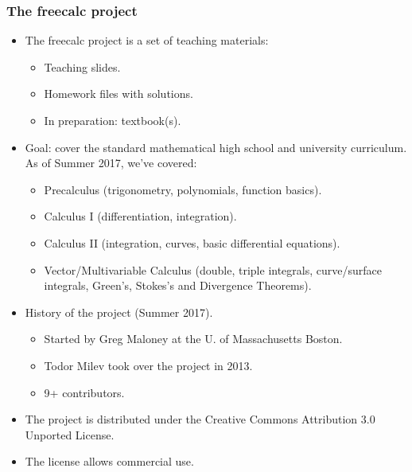 \begin{frame}
\frametitle{The freecalc project}
\begin{itemize}
\item The freecalc project is a set of teaching materials:
\begin{itemize}
\item Teaching slides.
\item Homework files with solutions.
\item In preparation: textbook(s).
\end{itemize}
\item Goal: cover the standard mathematical high school and university curriculum. As of Summer 2017, we've covered:
\begin{itemize}
\item Precalculus (trigonometry, polynomials, function basics).
\item Calculus I (differentiation, integration).
\item Calculus II (integration, curves, basic differential equations).
\item Vector/Multivariable Calculus (double, triple integrals, curve/surface integrals, Green's, Stokes's and Divergence Theorems).
\end{itemize}
\item History of the project (Summer 2017).
\begin{itemize}
\item Started by Greg Maloney at the U. of Massachusetts Boston.
\item Todor Milev took over the project in 2013. 
\item 9+ contributors. 
\end{itemize}
\item The project is distributed under the Creative Commons Attribution 3.0 Unported License. 
\item The license allows commercial use.
\end{itemize}
\end{frame}